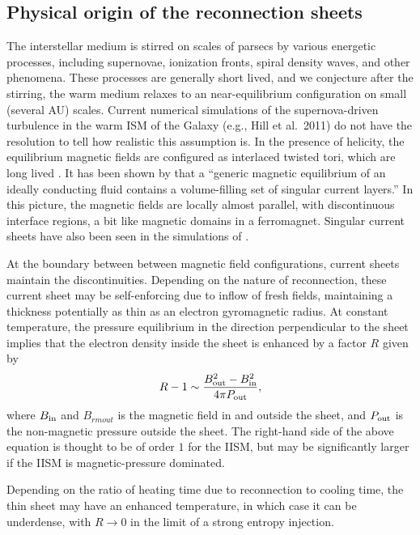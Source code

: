 \documentclass[useAMS,usenatbib]{mn2e}
\begin{document}


\subsection{Physical origin of the reconnection sheets}

The interstellar medium is stirred on scales of parsecs by various
energetic processes, including supernovae, ionization fronts, spiral
density waves, and other phenomena.  These processes are generally
short lived, and we conjecture after the stirring, the warm medium
relaxes to an near-equilibrium configuration on small (several AU)
scales. Current numerical simulations of the supernova-driven
turbulence in the warm ISM of the Galaxy (e.g., Hill et al.~2011) do
not have the resolution to tell how realistic this assumption is.  In
the presence of helicity, the equilibrium magnetic fields are
configured as interlaced twisted tori, which are long lived
\citep{2004Natur.431..819B}.  It has been shown by \cite{2009arXiv0909.1815G}
that a ``generic magnetic equilibrium of an ideally conducting fluid
contains a volume-filling set of singular current layers.'' In this
picture, the magnetic fields are locally almost parallel, with
discontinuous interface regions, a bit like magnetic domains in a
ferromagnet. Singular current sheets have also been seen in the
simulations of \citet{2004PhRvL..92h4504S}.

At the boundary between between magnetic field configurations, current
sheets maintain the discontinuities.  Depending on the nature of
reconnection, these current sheet may be self-enforcing due to inflow
of fresh fields, maintaining a thickness potentially as thin as an
electron gyromagnetic radius.  At constant temperature,
the pressure equilibrium in the direction
perpendicular to the sheet implies that the electron density inside the sheet is
enhanced by a factor $R$ given by
\begin{equation} 
R-1\sim {B_{\rm out}^2-B_{\rm in}^2\over 4\pi P_{\rm out}},
\label{ratio}
\end{equation}
  where $B_{\rm in}$ and $B_{rm out}$ is the magnetic field in and outside the sheet,
  and $P_{\rm out}$ is the non-magnetic pressure outside the sheet. The right-hand side of
  the above equation is thought to be of order $1$ for the IISM, but may be significantly
  larger if the IISM is magnetic-pressure dominated. 

Depending on the ratio of heating time due to reconnection to cooling
time, the thin sheet may have an enhanced temperature, in which case
it can be underdense, with $R \rightarrow 0$ in the limit of a
strong entropy injection.
\end{document}
